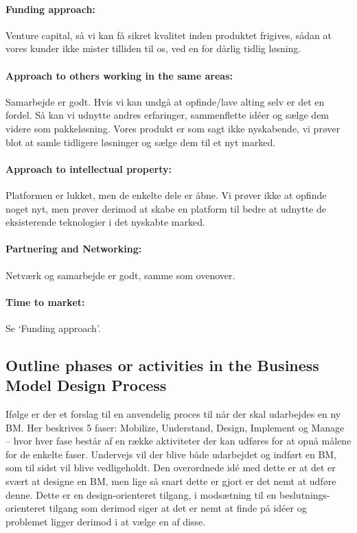 \paragraph{Funding approach:} Venture capital, så vi kan få sikret kvalitet inden produktet frigives, sådan at vores kunder ikke mister tilliden til os, ved en for dårlig tidlig løsning.

\paragraph{Approach to others working in the same areas:} Samarbejde er godt.
Hvis vi kan undgå at opfinde/lave alting selv er det en fordel.
Så kan vi udnytte andres erfaringer, sammenflette idéer og sælge dem videre som pakkeløsning.
Vores produkt er som sagt ikke nyskabende, vi prøver blot at samle tidligere løsninger og sælge dem til et nyt marked.

\paragraph{Approach to intellectual property:} Platformen er lukket, men de enkelte dele er åbne.
Vi prøver ikke at opfinde noget nyt, men prøver derimod at skabe en platform til bedre at udnytte de eksisterende teknologier i det nyskabte marked.

\paragraph{Partnering and Networking:} Netværk og samarbejde er godt, samme som ovenover.

\paragraph{Time to market:} Se `Funding approach'.

\subsection{Outline phases or activities in the Business Model Design Process}
Ifølge \citet[pp. 244-259]{osterwalder2009business} er der et forslag til en anvendelig proces til når der skal udarbejdes en ny BM.
Her beskrives 5 faser: Mobilize, Understand, Design, Implement og Manage -- hvor hver fase består af en række aktiviteter der kan udføres for at opnå målene for de enkelte faser.
Undervejs vil der blive både udarbejdet og indført en BM, som til sidst vil blive vedligeholdt.
Den overordnede idé med dette er at det er svært at designe en BM, men lige så snart dette er gjort er det nemt at udføre denne.
Dette er en design-orienteret tilgang, i modsætning til en beslutnings-orienteret tilgang som derimod siger at det er nemt at finde på idéer og problemet ligger derimod i at vælge en af disse.

